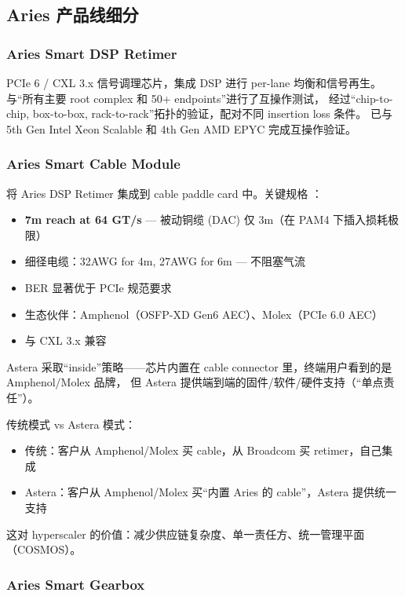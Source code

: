 \subsection{Aries 产品线细分}

\subsubsection{Aries Smart DSP Retimer}

PCIe 6 / CXL 3.x 信号调理芯片，集成 DSP 进行 per-lane 均衡和信号再生。
与``所有主要 root complex 和 50+ endpoints''进行了互操作测试，
经过``chip-to-chip, box-to-box, rack-to-rack''拓扑的验证，配对不同 insertion loss 条件。
已与 5th Gen Intel Xeon Scalable 和 4th Gen AMD EPYC 完成互操作验证。

\subsubsection{Aries Smart Cable Module}

将 Aries DSP Retimer 集成到 cable paddle card 中。关键规格 ：
\begin{itemize}
    \item \textbf{7m reach at 64 GT/s} — 被动铜缆 (DAC) 仅 3m（在 PAM4 下插入损耗极限）
    \item 细径电缆：32AWG for 4m, 27AWG for 6m — 不阻塞气流
    \item BER 显著优于 PCIe 规范要求
    \item 生态伙伴：Amphenol（OSFP-XD Gen6 AEC）、Molex（PCIe 6.0 AEC）
    \item 与 CXL 3.x 兼容
\end{itemize}

Astera 采取``inside''策略——芯片内置在 cable connector 里，终端用户看到的是 Amphenol/Molex 品牌，
但 Astera 提供端到端的固件/软件/硬件支持（``单点责任''）。

传统模式 vs Astera 模式：
\begin{itemize}
    \item 传统：客户从 Amphenol/Molex 买 cable，从 Broadcom 买 retimer，自己集成
    \item Astera：客户从 Amphenol/Molex 买``内置 Aries 的 cable''，Astera 提供统一支持
\end{itemize}

这对 hyperscaler 的价值：减少供应链复杂度、单一责任方、统一管理平面（COSMOS）。

\subsubsection{Aries Smart Gearbox}


